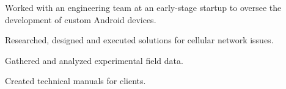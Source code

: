 \documentclass[]{deedy-resume-openfont}
\begin{document}
\begin{minipage}[t]{0.66\textwidth}

\begin{tightemize}
\item Worked with an engineering team at an early-stage startup to oversee the development of custom Android devices.
\item Researched, designed and executed solutions for cellular network issues.
\item Gathered and analyzed experimental field data.
\item Created technical manuals for clients.
\end{tightemize}
\sectionsep




\end{minipage}
\end{document}
